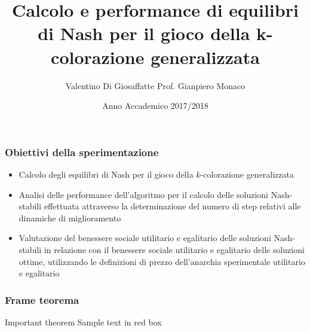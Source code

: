 \documentclass{beamer}
\title{Calcolo e performance di equilibri di Nash per il gioco della k-colorazione generalizzata}
\author{Valentino Di Giosaffatte \hfill Prof. Gianpiero Monaco}
\institute{Università degli Studi dell'Aquila}
\date{Anno Accademico 2017/2018}
\begin{document}
\frame{\titlepage}

\begin{frame}

\frametitle{Obiettivi della sperimentazione}

\begin{itemize}
	\item Calcolo degli equilibri di Nash per il gioco della $k$-colorazione generalizzata
	\item Analisi delle performance dell'algoritmo per il calcolo delle soluzioni Nash-stabili effettuata attraverso la determinazione del numero di step relativi alle dinamiche di miglioramento
	\item Valutazione del benessere sociale utilitario e egalitario delle soluzioni Nash-stabili in relazione con il benessere sociale utilitario e egalitario delle soluzioni ottime, utilizzando le definizioni di prezzo dell'anarchia sperimentale utilitario e egalitario
\end{itemize}

\end{frame}

\begin{frame}

\frametitle{Frame teorema}
 
\begin{alertblock}{Important theorem}
Sample text in red box
\end{alertblock}
 
\end{frame}
\end{document}
